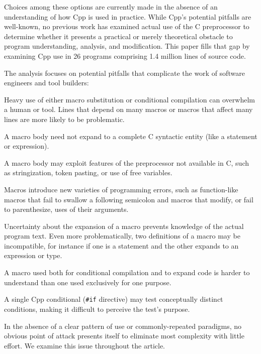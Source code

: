 \documentclass[10pt]{article}
\def\typeofdocument{article}    %
\def\numpackages{26}
\def\numlines{1.4 million}      %
\begin{document}
Choices among these options are currently made in the absence of
an understanding of how Cpp is used in practice.
While  Cpp's potential pitfalls are well-known, no
previous work has examined actual use of the C preprocessor to
determine whether it presents a practical or merely theoretical
obstacle to program understanding, analysis, and modification.  This
paper fills that gap by examining Cpp use in {\numpackages} programs
comprising {\numlines} lines of source code.

The analysis focuses on potential pitfalls that complicate the work of
software engineers and tool builders:
\begin{description}\itemsep 0pt \parskip 0pt
\item[high total use {\rm (Sections~\ref{sec:directives}, \ref{sec:macro-usage}, and~\ref{sec:dependence}):}]
  Heavy use of either macro substitution or conditional compilation can
  overwhelm a human or tool.  Lines that
  depend on many macros or macros that affect many lines are more
  likely to be problematic.
\item[complicated bodies {\rm (Section~\ref{sec:categorization}):}]
  A macro body need not expand to a complete C syntactic entity (like a
  statement or expression).
\item[extra-linguistic features {\rm (Section~\ref{sec:extra-linguistic}):}]
  A macro body may exploit features of the preprocessor not available in C,
  such as stringization, token pasting, or use of free variables.
\item[macro pitfalls {\rm (Section~\ref{sec:lint}):}]
  Macros introduce new varieties of programming errors, such as
  function-like macros that fail to swallow a following semicolon and
  macros that modify, or fail to parenthesize, uses of their arguments.
\item[multiple definitions {\rm (Sections~\ref{sec:mult-def}--\ref{sec:inconsistent}):}]
  Uncertainty about the expansion of a macro prevents knowledge of the
  actual program text.  Even more problematically, two definitions of a
  macro may be incompatible, for instance if one is a statement and the
  other expands to an expression or type.
\item[inconsistent usage {\rm (Section~\ref{sec:inconsistent-usage}):}]
  A macro used both for conditional compilation and to expand code is
  harder to understand than one used exclusively for one purpose.
\item[mixed tests {\rm (Section~\ref{sec:ccd}):}]
  A single Cpp conditional ({\tt \#if} directive) may test conceptually
  distinct conditions, making it difficult to perceive the
  test's purpose.
\item[variation in use]
  In the absence of a clear pattern of use or commonly-repeated paradigms,
  no obvious point of attack presents itself to eliminate most complexity
  with little effort.  We examine this issue throughout the \typeofdocument.
\end{description}
\end{document}
